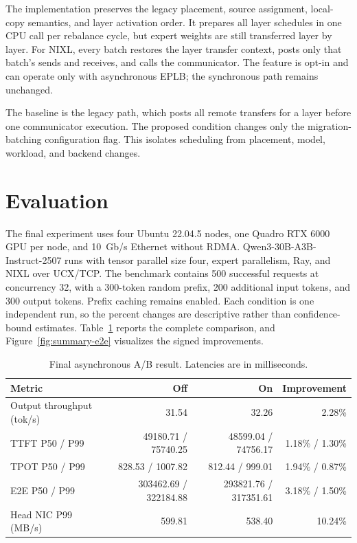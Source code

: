 \documentclass[10pt,a4paper]{article}
\begin{document}
The implementation preserves the legacy placement, source assignment, local-copy
semantics, and layer activation order. It prepares all layer schedules in one CPU
call per rebalance cycle, but expert weights are still transferred layer by layer.
For NIXL, every batch restores the layer transfer context, posts only that batch's
sends and receives, and calls the communicator. The feature is opt-in and can
operate only with asynchronous EPLB; the synchronous path remains unchanged.

The baseline is the legacy path, which posts all remote transfers for a layer
before one communicator execution. The proposed condition changes only the
migration-batching configuration flag. This isolates scheduling from placement,
model, workload, and backend changes.

\section{Evaluation}

The final experiment uses four Ubuntu 22.04.5 nodes, one Quadro RTX 6000 GPU per
node, and 10~Gb/s Ethernet without RDMA. Qwen3-30B-A3B-Instruct-2507 runs
with tensor parallel size four, expert parallelism, Ray, and NIXL over UCX/TCP.
The benchmark contains 500 successful requests at concurrency 32, with a
300-token random prefix, 200 additional input tokens, and 300 output tokens.
Prefix caching remains enabled. Each condition is one independent run, so the
percent changes are descriptive rather than confidence-bound estimates.
Table~\ref{tab:summary-e2e} reports the complete comparison, and
Figure~\ref{fig:summary-e2e} visualizes the signed improvements.

\begin{table}[ht]
  \centering
  \small
  \caption{Final asynchronous A/B result. Latencies are in milliseconds.}
  \label{tab:summary-e2e}
  \begin{tabular}{lrrr}
    \toprule
    Metric & Off & On & Improvement \\
    \midrule
    Output throughput (tok/s) & 31.54 & 32.26 & 2.28\% \\
    TTFT P50 / P99 & 49180.71 / 75740.25 & 48599.04 / 74756.17 & 1.18\% / 1.30\% \\
    TPOT P50 / P99 & 828.53 / 1007.82 & 812.44 / 999.01 & 1.94\% / 0.87\% \\
    E2E P50 / P99 & 303462.69 / 322184.88 & 293821.76 / 317351.61 & 3.18\% / 1.50\% \\
    Head NIC P99 (MB/s) & 599.81 & 538.40 & 10.24\% \\
    \bottomrule
  \end{tabular}
\end{table}
\end{document}
